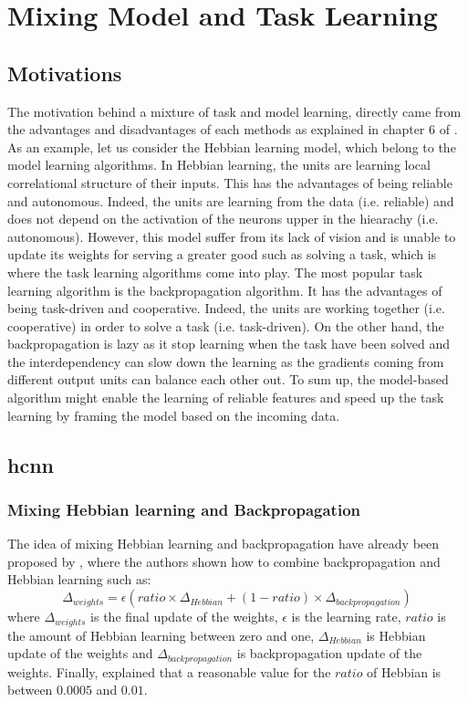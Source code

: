 \documentclass[11pt]{report}
\begin{document}
\chapter{Mixing Model and Task Learning} \label{model_and_task_learning}

\section{Motivations}

The motivation behind a mixture of task and model learning, directly came from the advantages and disadvantages of each methods as explained in chapter 6 of \textcite{OReilly:2000:CEC:557205}. As an example, let us consider the Hebbian learning model, which belong to the model learning algorithms. In Hebbian learning, the units are learning local correlational structure of their inputs. This has the advantages of being reliable and autonomous. Indeed, the units are learning from the data (i.e. reliable) and does not depend on the activation of the neurons upper in the hiearachy (i.e. autonomous). However, this model suffer from its lack of vision and is unable to update its weights for serving a greater good such as solving a task, which is where the task learning algorithms come into play. The most popular task learning algorithm is the backpropagation algorithm. It has the advantages of being task-driven and cooperative. Indeed, the units are working together (i.e. cooperative) in order to solve a task (i.e. task-driven). On the other hand, the backpropagation is lazy as it stop learning when the task have been solved and the interdependency can slow down the learning as the gradients coming from different output units can balance each other out. To sum up, the model-based algorithm might enable the learning of reliable features and speed up the task learning by framing the model based on the incoming data.

\section{\acrlong{hcnn}}

\subsection{Mixing Hebbian learning and Backpropagation} \label{sec:mix_hebb_bp}

The idea of mixing Hebbian learning and backpropagation have already been proposed by \textcite{OReilly:2000:CEC:557205}, where the authors shown how to combine backpropagation and Hebbian learning such as:
\begin{equation}
\Delta_{weights} = \epsilon (ratio \times \Delta_{Hebbian} + (1 - ratio) \times \Delta_{backpropagation})
\end{equation}
where $\Delta_{weights}$ is the final update of the weights, $\epsilon$ is the learning rate, $ratio$ is the amount of Hebbian learning between zero and one, $\Delta_{Hebbian}$ is Hebbian update of the weights and $\Delta_{backpropagation}$ is backpropagation update of the weights. Finally, \textcite{OReilly:2000:CEC:557205} explained that a reasonable value for the $ratio$ of Hebbian is between $0.0005$ and $0.01$.
\end{document}
